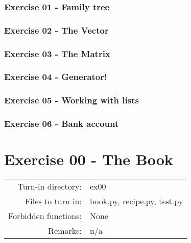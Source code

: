 \documentclass[]{article}
\begin{document}
\hypertarget{exercise-01---family-tree}{%
\subsubsection{Exercise 01 - Family
tree}\label{exercise-01---family-tree}}

\hypertarget{exercise-02---the-vector}{%
\subsubsection{Exercise 02 - The
Vector}\label{exercise-02---the-vector}}

\hypertarget{exercise-03---the-matrix}{%
\subsubsection{Exercise 03 - The
Matrix}\label{exercise-03---the-matrix}}

\hypertarget{exercise-04---generator}{%
\subsubsection{Exercise 04 - Generator!}\label{exercise-04---generator}}

\hypertarget{exercise-05---working-with-lists}{%
\subsubsection{Exercise 05 - Working with
lists}\label{exercise-05---working-with-lists}}

\hypertarget{exercise-06---bank-account}{%
\subsubsection{Exercise 06 - Bank
account}\label{exercise-06---bank-account}}

\clearpage

\hypertarget{exercise-00---the-book-1}{%
\section{Exercise 00 - The Book}\label{exercise-00---the-book-1}}

\begin{longtable}[]{@{}rl@{}}
\toprule
\endhead
Turn-in directory: & ex00\tabularnewline
Files to turn in: & book.py, recipe.py, test.py\tabularnewline
Forbidden functions: & None\tabularnewline
Remarks: & n/a\tabularnewline
\bottomrule
\end{longtable}
\end{document}
